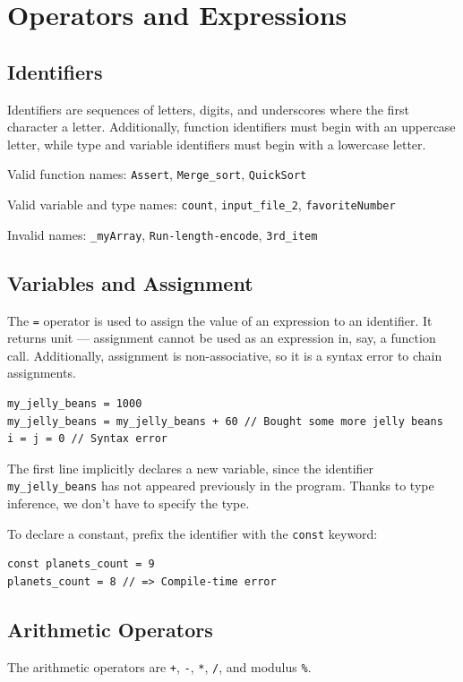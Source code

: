 \documentclass[11pt, onecolumn, letterpaper]{article}
\begin{document}
\section{Operators and Expressions}

\subsection{Identifiers}
Identifiers are sequences of letters, digits, and underscores where the first character a letter. Additionally, function identifiers must begin with an uppercase letter, while type and variable identifiers must begin with a lowercase letter.

Valid function names: \texttt{Assert}, \texttt{Merge\_sort}, \texttt{QuickSort}

Valid variable and type names: \texttt{count}, \texttt{input\_file\_2}, \texttt{favoriteNumber}

Invalid names: \texttt{\_myArray}, \texttt{Run-length-encode}, \texttt{3rd\_item}

\subsection{Variables and Assignment}

The \texttt{=} operator is used to assign the value of an expression to an identifier. It returns unit --- assignment cannot be used as an expression in, say, a function call. Additionally, assignment is non-associative, so it is a syntax error to chain assignments.

\begin{lstlisting}
my_jelly_beans = 1000
my_jelly_beans = my_jelly_beans + 60 // Bought some more jelly beans
i = j = 0 // Syntax error
\end{lstlisting}

The first line implicitly declares a new variable, since the identifier \texttt{my\_jelly\_beans} has not appeared previously in the program. Thanks to type inference, we don't have to specify the type.

To declare a constant, prefix the identifier with the \texttt{const} keyword:

\begin{lstlisting}
const planets_count = 9
planets_count = 8 // => Compile-time error
\end{lstlisting}

\subsection{Arithmetic Operators}
The arithmetic operators are \texttt{+}, \texttt{-}, \texttt{*}, \texttt{/}, and modulus \texttt{\%}. 
\end{document}
